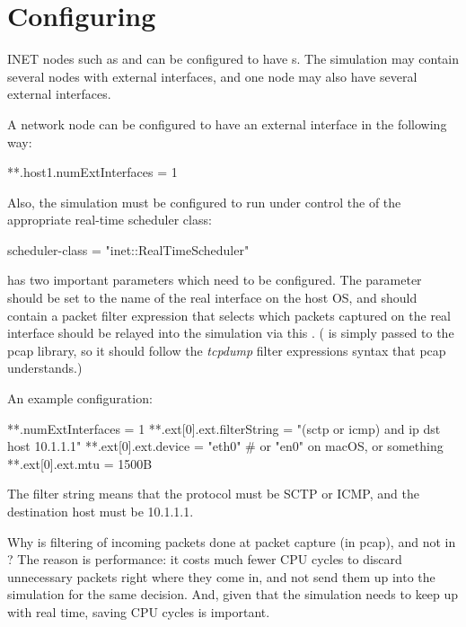 \section{Configuring}
\label{sec:emulation:configuring}

INET nodes such as  and 
can be configured to have s.
The simulation may contain several nodes with external interfaces,
and one node may also have several external interfaces.

A network node can be configured to have an external interface
in the following way:

\begin{inifile}
**.host1.numExtInterfaces = 1
\end{inifile}

Also, the simulation must be configured to run under control the of the
appropriate real-time scheduler class:

\begin{inifile}
scheduler-class = "inet::RealTimeScheduler"
\end{inifile}

 has two important parameters which need to be
configured. The  parameter should be set to the name of the real
interface on the host OS, and  should contain a packet
filter expression that selects which packets captured on the real interface
should  be relayed into the simulation via this .
( is simply passed to the pcap library, so it should
follow the \textit{tcpdump} filter expressions syntax that pcap understands.)

An example configuration:

\begin{inifile}
**.numExtInterfaces = 1
**.ext[0].ext.filterString = "(sctp or icmp) and ip dst host 10.1.1.1"
**.ext[0].ext.device = "eth0" # or "en0" on macOS, or something
**.ext[0].ext.mtu = 1500B
\end{inifile}

The filter string  means
that the protocol must be SCTP or ICMP, and the destination host must be
10.1.1.1.

\begin{note}
Why is filtering of incoming packets done at packet capture (in pcap),
and not in ? The reason is performance: it costs
much fewer CPU cycles to discard unnecessary packets right where
they come in, and not send them up into the simulation for the
same decision. And, given that the simulation needs to keep up with
real time, saving CPU cycles is important.
\end{note}

